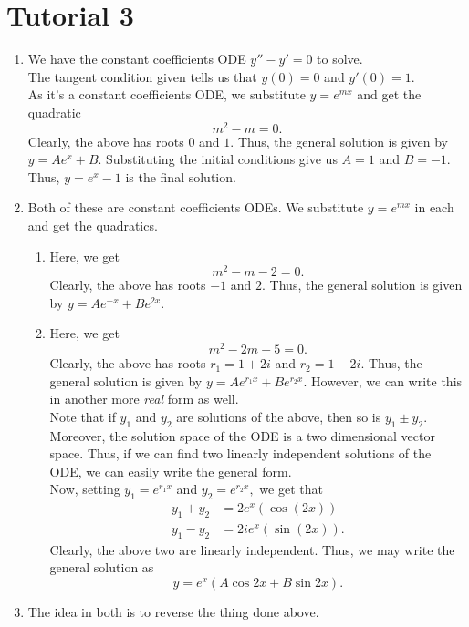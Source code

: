 \documentclass[12pt]{article}
\theoremstyle{definition}
\numberwithin{thm}{section}
\begin{document}
\newpage\section{Tutorial 3}

\begin{enumerate}[leftmargin=*, label = Q.\arabic*.] 
	\item We have the constant coefficients ODE $y'' - y' = 0$ to solve.\\
	The tangent condition given tells us that $y(0) = 0$ and $y'(0) = 1.$\\
	As it's a constant coefficients ODE, we substitute $y = e^{mx}$ and get the quadratic
	\[m^2 - m = 0.\]
	Clearly, the above has roots $0$ and $1.$ Thus, the general solution is given by $y = Ae^x + B.$ Substituting the initial conditions give us $A = 1$ and $B = -1.$\\
	Thus, $y = e^x - 1$ is the final solution.
	\item \label{q2} Both of these are constant coefficients ODEs. We substitute $y = e^{mx}$ in each and get the quadratics.
	\begin{enumerate}[label = (\roman*)] 
		\item Here, we get
		\[m^2 - m - 2 = 0.\]
		Clearly, the above has roots $-1$ and $2.$ Thus, the general solution is given by $y = Ae^{-x} + Be^{2x}.$ 
		\item Here, we get
		\[m^2 - 2m + 5 = 0.\]
		Clearly, the above has roots $r_1 = 1 + 2i$ and $r_2 = 1 - 2i.$ Thus, the general solution is given by $y = Ae^{r_1x} + Be^{r_2x}.$ However, we can write this in another more \emph{real} form as well.\\
		Note that if $y_1$ and $y_2$ are solutions of the above, then so is $y_1 \pm y_2.$ Moreover, the solution space of the ODE is a two dimensional vector space. Thus, if we can find two linearly independent solutions of the ODE, we can easily write the general form.\\
		Now, setting $y_1 = e^{r_1x}$ and $y_2 = e^{r_2x},$ we get that
		\begin{align*} 
			y_1 + y_2 &= 2e^x(\cos(2x))\\
			y_1 - y_2 &= 2ie^x(\sin(2x)).
		\end{align*}
		Clearly, the above two are linearly independent. Thus, we may write the general solution as
		\[y = e^x(A\cos2x + B\sin 2x).\]
	\end{enumerate}
	\item The idea in both is to reverse the thing done above.
	\begin{enumerate}[label = (\roman*)] 

\end{enumerate}
\end{enumerate}
\end{document}
